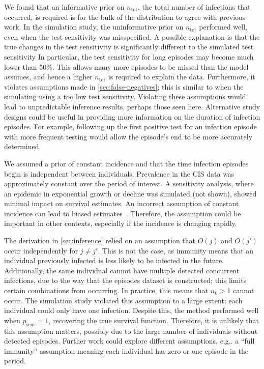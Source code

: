 \documentclass[12pt]{article}
\makeatletter
\newcommand{\psens}{p_\text{sens}}
\newcommand{\ntot}{n_\text{tot}}
\DeclareRobustCommand\onedot{\futurelet\@let@token\@onedot}
\def\@onedot{\ifx\@let@token.\else.\null\fi\xspace}
\def\eg{e.g\onedot} \def\Eg{{E.g}\onedot}
\makeatother
\begin{document}
We found that an informative prior on $\ntot$, the total number of infections that occurred, is required is for the bulk of the distribution to agree with previous work.
In the simulation study, the uninformative prior on $\ntot$ performed well, even when the test sensitivity was misspecified.
A possible explanation is that the true changes in the test sensitivity is significantly different to the simulated test sensitivity
In particular, the test sensitivity for long episodes may become much lower than 50\%.
This allows many more episodes to be missed than the model assumes, and hence a higher $\ntot$ is required to explain the data.
Furthermore, it violates assumptions made in \cref{sec:false-negatives}; this is similar to when the simulating using a too low test sensitivity.
Violating these assumptions would lead to unpredictable inference results, perhaps those seen here.
Alternative study designs could be useful in providing more information on the duration of infection episodes.
For example, following up the first positive test for an infection episode with more frequent testing would allow the episode's end to be more accurately determined.

We assumed a prior of constant incidence and that the time infection episodes begin is independent between individuals.
Prevalence in the CIS data was approximately constant over the period of interest.
A sensitivity analysis, where an epidemic in exponential growth or decline was simulated (not shown), showed minimal impact on survival estimates.
An incorrect assumption of constant incidence can lead to biased estimates~\citep{degruttolaAnalysis}.
Therefore, the assumption could be important in other contexts, especially if the incidence is changing rapidly.


The derivation in \cref{sec:inference} relied on an assumption that $O(j)$ and $O(j')$ occur independently for $j \neq j'$.
This is not the case, as immunity means that an individual previously infected is less likely to be infected in the future.
Additionally, the same individual cannot have multiple detected concurrent infections, due to the way that the episodes dataset is constructed; this limits certain combinations from occurring.
In practice, this means that $n_k > 1$ cannot occur.
The simulation study violated this assumption to a large extent: each individual could only have one infection.
Despite this, the method performed well when $\psens = 1$, recovering the true survival function.
Therefore, it is unlikely that this assumption matters, possibly due to the large number of individuals without detected episodes.
Further work could explore different assumptions, \eg a ``full immunity'' assumption meaning each individual has zero or one episode in the period.
\end{document}
